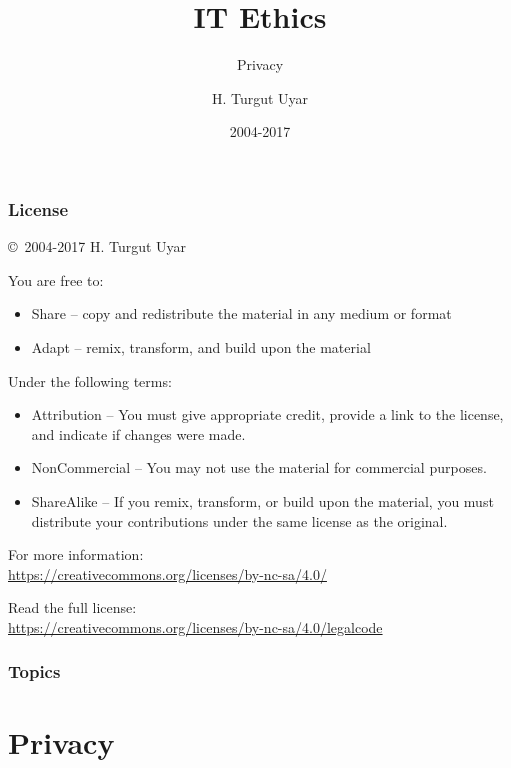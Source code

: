 \documentclass[dvipsnames]{beamer}
\title{IT Ethics}
\subtitle{Privacy}
\author{H. Turgut Uyar}
\date{2004-2017}
\theoremstyle{plain}
\begin{document}
\begin{frame}
  \titlepage
\end{frame}

\begin{frame}
  \frametitle{License}

  \hfill
  \copyright~2004-2017 H. Turgut Uyar

  \vfill
  \begin{footnotesize}
    You are free to:
    \begin{itemize}
      \itemsep0em
      \item Share -- copy and redistribute the material in any medium or format
      \item Adapt -- remix, transform, and build upon the material
    \end{itemize}

    Under the following terms:
    \begin{itemize}
      \itemsep0em
      \item Attribution -- You must give appropriate credit, provide a link to
        the license, and indicate if changes were made.

      \item NonCommercial -- You may not use the material for commercial
        purposes.

      \item ShareAlike -- If you remix, transform, or build upon the material,
        you must distribute your contributions under the same license as the
        original.
    \end{itemize}
  \end{footnotesize}

  \begin{small}
    For more information:\\
    \url{https://creativecommons.org/licenses/by-nc-sa/4.0/}

    \smallskip
    Read the full license:\\
    \url{https://creativecommons.org/licenses/by-nc-sa/4.0/legalcode}
  \end{small}
\end{frame}

\begin{frame}
  \frametitle{Topics}
  \tableofcontents
\end{frame}

\section{Privacy}
\end{document}
